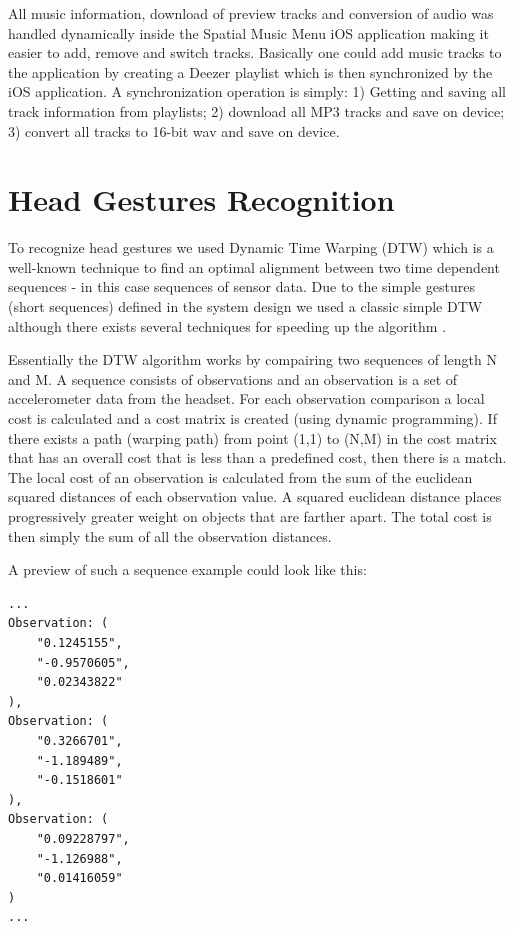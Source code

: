 All music information, download of preview tracks and conversion of audio was handled dynamically inside the Spatial Music Menu iOS application making it easier to add, remove and switch tracks. Basically one could add music tracks to the application by creating a Deezer playlist which is then synchronized by the iOS application. A synchronization operation is simply: 1) Getting and saving all track information from playlists; 2) download all MP3 tracks and save on device; 3) convert all tracks to 16-bit wav and save on device.


\section{Head Gestures Recognition}
\label{sec:implementationgesturerecognition}
To recognize head gestures we used Dynamic Time Warping (DTW) which is a well-known technique to find an optimal alignment between two time dependent sequences \cite{muller_dynamic_2007} - in this case sequences of sensor data. Due to the simple gestures (short sequences) defined in the system design we used a classic simple DTW although there exists several techniques for speeding up the algorithm \cite{muller_dynamic_2007,salvador_toward_2007,akl_accelerometer-based_2010}. 

Essentially the DTW algorithm works by compairing two sequences of length N and M. A sequence consists of observations and an observation is a set of accelerometer data from the headset. For each observation comparison a local cost is calculated and a cost matrix is created (using dynamic programming). If there exists a path (warping path) from point (1,1) to (N,M) in the cost matrix that has an overall cost that is less than a predefined cost, then there is a match. The local cost of an observation is calculated from the sum of the euclidean squared distances of each observation value. A squared euclidean distance places progressively greater weight on objects that are farther apart. The total cost is then simply the sum of all the observation distances.

A preview of such a sequence example could look like this:

\begin{lstlisting}
...
Observation: (
    "0.1245155",
    "-0.9570605",
    "0.02343822"
),
Observation: (
    "0.3266701",
    "-1.189489",
    "-0.1518601"
),
Observation: (
    "0.09228797",
    "-1.126988",
    "0.01416059"
)
...
\end{lstlisting}

